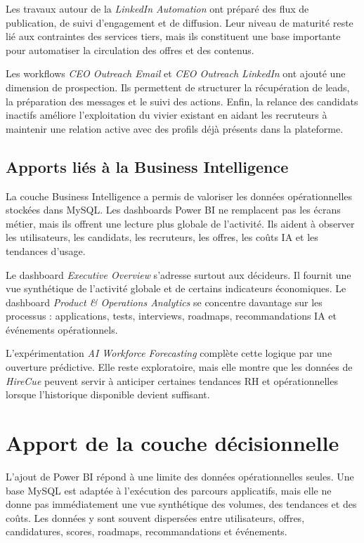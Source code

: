 Les travaux autour de la \textit{LinkedIn Automation} ont préparé des flux de publication, de suivi d'engagement et de diffusion. Leur niveau de maturité reste lié aux contraintes des services tiers, mais ils constituent une base importante pour automatiser la circulation des offres et des contenus.

Les workflows \textit{CEO Outreach Email} et \textit{CEO Outreach LinkedIn} ont ajouté une dimension de prospection. Ils permettent de structurer la récupération de leads, la préparation des messages et le suivi des actions. Enfin, la relance des candidats inactifs améliore l'exploitation du vivier existant en aidant les recruteurs à maintenir une relation active avec des profils déjà présents dans la plateforme.

\subsection{Apports liés à la Business Intelligence}

La couche Business Intelligence a permis de valoriser les données opérationnelles stockées dans MySQL. Les dashboards Power BI ne remplacent pas les écrans métier, mais ils offrent une lecture plus globale de l'activité. Ils aident à observer les utilisateurs, les candidats, les recruteurs, les offres, les coûts IA et les tendances d'usage.

Le dashboard \textit{Executive Overview} s'adresse surtout aux décideurs. Il fournit une vue synthétique de l'activité globale et de certains indicateurs économiques. Le dashboard \textit{Product \& Operations Analytics} se concentre davantage sur les processus : applications, tests, interviews, roadmaps, recommandations IA et événements opérationnels.

L'expérimentation \textit{AI Workforce Forecasting} complète cette logique par une ouverture prédictive. Elle reste exploratoire, mais elle montre que les données de \textit{HireCue} peuvent servir à anticiper certaines tendances RH et opérationnelles lorsque l'historique disponible devient suffisant.

\section{Apport de la couche décisionnelle}

L'ajout de Power BI répond à une limite des données opérationnelles seules. Une base MySQL est adaptée à l'exécution des parcours applicatifs, mais elle ne donne pas immédiatement une vue synthétique des volumes, des tendances et des coûts. Les données y sont souvent dispersées entre utilisateurs, offres, candidatures, scores, roadmaps, recommandations et événements.

